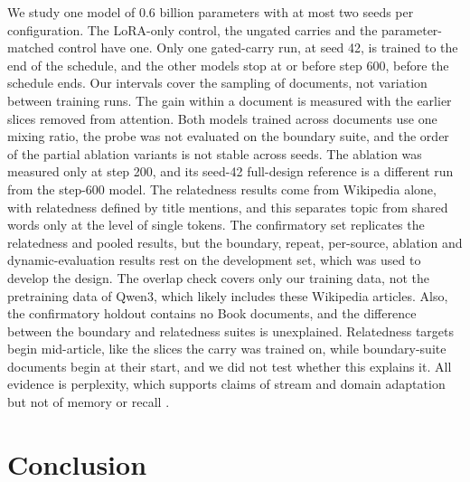 \documentclass[10pt]{article} %
\begin{document}
We study one model of 0.6 billion parameters with at most two seeds per configuration. The LoRA-only control, the ungated carries and the parameter-matched control have one. Only one gated-carry run, at seed 42, is trained to the end of the schedule, and the other models stop at or before step 600, before the schedule ends. Our intervals cover the sampling of documents, not variation between training runs. The gain within a document is measured with the earlier slices removed from attention. Both models trained across documents use one mixing ratio, the probe was not evaluated on the boundary suite, and the order of the partial ablation variants is not stable across seeds. The ablation was measured only at step 200, and its seed-42 full-design reference is a different run from the step-600 model. The relatedness results come from Wikipedia alone, with relatedness defined by title mentions, and this separates topic from shared words only at the level of single tokens. The confirmatory set replicates the relatedness and pooled results, but the boundary, repeat, per-source, ablation and dynamic-evaluation results rest on the development set, which was used to develop the design. The overlap check covers only our training data, not the pretraining data of Qwen3, which likely includes these Wikipedia articles. Also, the confirmatory holdout contains no Book documents, and the difference between the boundary and relatedness suites is unexplained. Relatedness targets begin mid-article, like the slices the carry was trained on, while boundary-suite documents begin at their start, and we did not test whether this explains it. All evidence is perplexity, which supports claims of stream and domain adaptation but not of memory or recall \citep{song2026beyond}.

\section{Conclusion}
\end{document}
